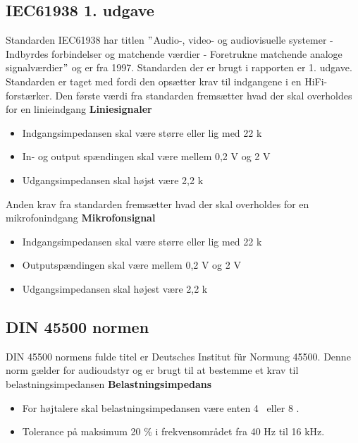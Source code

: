 \subsection*{IEC61938 1. udgave}
\label{IEC61938}
Standarden IEC61938 har titlen $"$Audio-, video- og audiovisuelle systemer - Indbyrdes forbindelser og matchende værdier - Foretrukne matchende analoge signalværdier$"$ og er fra 1997. Standarden der er brugt i rapporten er 1. udgave. Standarden er taget med fordi den opsætter krav til indgangene i en HiFi-forstærker.\cite{IEC61938} 
\newline
\newline
Den første værdi fra standarden fremsætter hvad der skal overholdes for en linieindgang
\newline
\newline
\textbf{Liniesignaler}
\begin{itemize}
\item Indgangsimpedansen skal være større eller lig med 22 k\ohm
\item In- og output spændingen skal være mellem 0,2 V og 2 V
\item Udgangsimpedansen skal højst være 2,2 k\ohm
\end{itemize}
Anden krav fra standarden fremsætter hvad der skal overholdes for en mikrofonindgang
\newline 
\newline
\textbf{Mikrofonsignal}
\begin{itemize}
\item Indgangsimpedansen skal være større eller lig med 22 k\ohm
\item Outputspændingen skal være mellem 0,2 V og 2 V
\item Udgangsimpedansen skal højest være 2,2 k\ohm
\end{itemize}


\subsection*{DIN 45500 normen}
\label{DIN45500}
DIN 45500 normens fulde titel er Deutsches Institut f\"{u}r Normung 45500. Denne norm gælder for audioudstyr og er brugt til at bestemme et krav til belastningsimpedansen
\newline 
\newline
\textbf{Belastningsimpedans}
\begin{itemize}
\item For højtalere skal belastningsimpedansen være enten 4 \ohm~eller 8 \ohm.
\item Tolerance på maksimum 20 \% i frekvensområdet fra 40 Hz til 16 kHz.
\end{itemize}